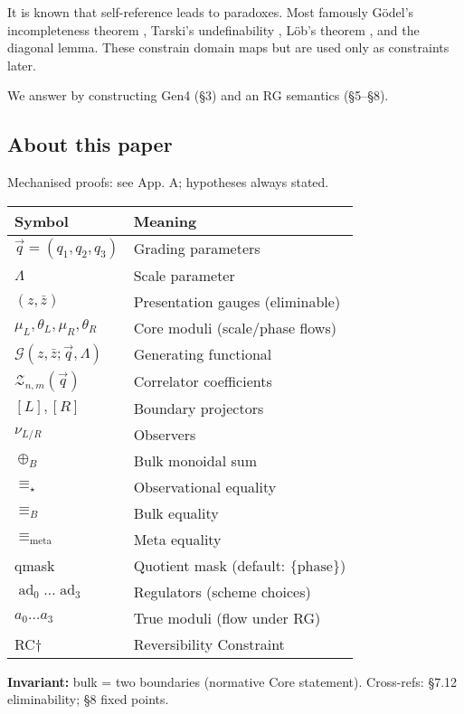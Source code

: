 It is known that self-reference leads to paradoxes. Most famously Gödel's incompleteness theorem \cite{godel1931}, Tarski's undefinability \cite{tarski1936}, Löb's theorem \cite{lob1955}, and the diagonal lemma. These constrain domain maps but are used only as constraints later.

We answer by constructing Gen4 (§3) and an RG semantics (§5–§8). 


\subsection{About this paper}

Mechanised proofs: see App. A; hypotheses always stated. 

\begin{notation}
\label{not:notation-ledger}
\centering
\footnotesize
\begin{tabular}{|l|l|}
\hline
\textbf{Symbol} & \textbf{Meaning} \\
\hline
$\vec q=(q_1,q_2,q_3)$ & Grading parameters \\
$\Lambda$ & Scale parameter \\
$(z,\bar z)$ & Presentation gauges (eliminable) \\
$\mu_L, \theta_L, \mu_R, \theta_R$ & Core moduli (scale/phase flows) \\
$\mathcal{G}(z,\bar z;\vec q,\Lambda)$ & Generating functional \\
$\mathcal{Z}_{n,m}(\vec q)$ & Correlator coefficients \\
$[L],[R]$ & Boundary projectors \\
$\nu_{L/R}$ & Observers \\
$\oplus_B$ & Bulk monoidal sum \\
$\equiv_\star$ & Observational equality \\
$\equiv_B$ & Bulk equality \\
$\equiv_{\text{meta}}$ & Meta equality \\
qmask & Quotient mask (default: $\{\text{phase}\}$) \\
$\operatorname{ad}_0\ldots\operatorname{ad}_3$ & Regulators (scheme choices) \\
$a_0\ldots a_3$ & True moduli (flow under RG) \\
RC† & Reversibility Constraint \\
\hline
\end{tabular}

\textbf{Invariant:} bulk = two boundaries (normative Core statement). Cross-refs: §7.12 eliminability; §8 fixed points.
\end{notation} 

